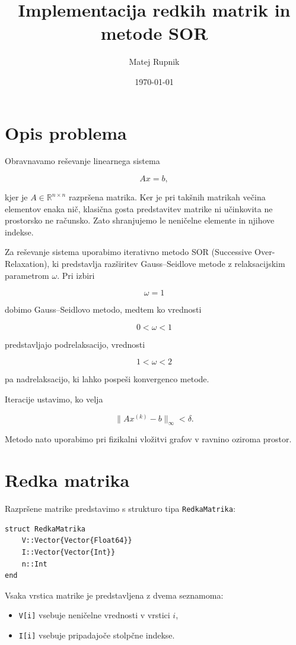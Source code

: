 \documentclass[a4paper,12pt]{article}
\title{Implementacija redkih matrik in metode SOR}
\author{Matej Rupnik}
\date{\today}
\begin{document}
\maketitle

\section{Opis problema}

Obravnavamo reševanje linearnega sistema

\[
A x = b,
\]

\noindent kjer je \(A \in \mathbb{R}^{n \times n}\) razpršena matrika. Ker je pri takšnih matrikah večina elementov enaka nič, klasična gosta predstavitev matrike ni učinkovita ne prostorsko ne računsko. Zato shranjujemo le neničelne elemente in njihove indekse.

\medskip

\noindent Za reševanje sistema uporabimo iterativno metodo SOR (Successive Over-Relaxation), ki predstavlja razširitev Gauss--Seidlove metode z relaksacijskim parametrom \(\omega\). Pri izbiri

\[
\omega = 1
\]

\noindent dobimo Gauss--Seidlovo metodo, medtem ko vrednosti

\[
0 < \omega < 1
\]

\noindent predstavljajo podrelaksacijo, vrednosti

\[
1 < \omega < 2
\]

\noindent pa nadrelaksacijo, ki lahko pospeši konvergenco metode.

\noindent Iteracije ustavimo, ko velja

\[
\|Ax^{(k)} - b\|_\infty < \delta.
\]

\noindent Metodo nato uporabimo pri fizikalni vložitvi grafov v ravnino oziroma prostor.

\newpage

\section{Redka matrika}

Razpršene matrike predstavimo s strukturo tipa \texttt{RedkaMatrika}:

\begin{verbatim}
struct RedkaMatrika
    V::Vector{Vector{Float64}}
    I::Vector{Vector{Int}}
    n::Int
end
\end{verbatim}

\noindent Vsaka vrstica matrike je predstavljena z dvema seznamoma:
\begin{itemize}
    \item \texttt{V[i]} vsebuje neničelne vrednosti v vrstici \(i\),
    \item \texttt{I[i]} vsebuje pripadajoče stolpčne indekse.
\end{itemize}
\end{document}
